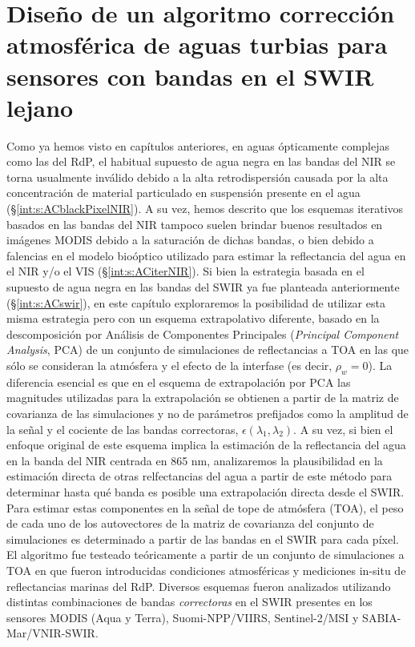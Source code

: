 \chapter{Diseño de un algoritmo corrección atmosférica de aguas turbias para sensores con bandas en el SWIR lejano}
\label{pca}

Como ya hemos visto en capítulos anteriores, en aguas ópticamente complejas como las del RdP, el habitual supuesto de agua negra en las bandas del NIR se torna usualmente inválido debido a la alta retrodispersión causada por la alta concentración de material particulado en suspensión presente en el agua (\S \ref{int:s:ACblackPixelNIR}). A su vez, hemos descrito que los esquemas iterativos basados en las bandas del NIR tampoco suelen brindar buenos resultados en imágenes MODIS debido a la saturación de dichas bandas, o bien debido a falencias en el modelo bioóptico utilizado para estimar la reflectancia del agua en el NIR y/o el VIS (\S \ref{int:s:ACiterNIR}). Si bien la estrategia basada en el supuesto de agua negra en las bandas del SWIR ya fue planteada anteriormente (\S \ref{int:s:ACswir}), en este capítulo exploraremos la posibilidad de utilizar esta misma estrategia pero con un esquema extrapolativo diferente, basado en la descomposición por Análisis de Componentes Principales (\textit{Principal Component Analysis}, PCA) de un conjunto de simulaciones de reflectancias a TOA en las que sólo se consideran la atmósfera y el efecto de la interfase (es decir, $\rho_{w}=0$). La diferencia esencial es que en el esquema de extrapolación por PCA las magnitudes utilizadas para la extrapolación se obtienen a partir de la matriz de covarianza de las simulaciones y no de parámetros prefijados como la amplitud de la señal y el cociente de las bandas correctoras, $\epsilon(\lambda_{1},\lambda_{2})$. A su vez, si bien el enfoque original de este esquema implica la estimación de la reflectancia del agua en la banda del NIR centrada en 865 nm, analizaremos la plausibilidad en la estimación directa de otras relfectancias del agua a partir de este método para determinar hasta qué banda es posible una extrapolación directa desde el SWIR. Para estimar estas componentes en la señal de tope de atmósfera (TOA), el peso de cada uno de los autovectores de la matriz de covarianza del conjunto de simulaciones es determinado a partir de las bandas en el SWIR para cada píxel. El algoritmo fue testeado teóricamente a partir de un conjunto de simulaciones a TOA en que fueron introducidas condiciones atmosféricas y mediciones in-situ de reflectancias marinas del RdP. Diversos esquemas fueron analizados utilizando distintas combinaciones de bandas \textit{correctoras} en el SWIR presentes en los sensores MODIS (Aqua y Terra), Suomi-NPP/VIIRS, Sentinel-2/MSI y SABIA-Mar/VNIR-SWIR.

